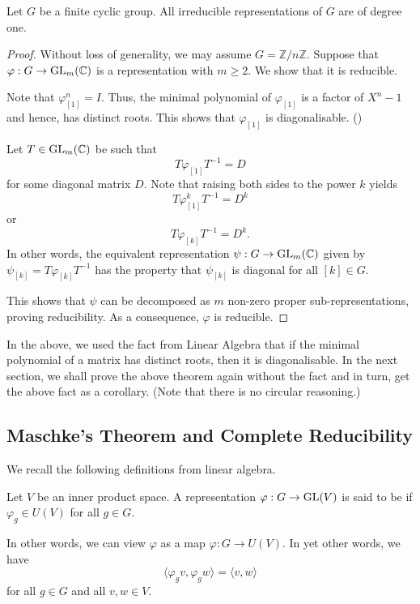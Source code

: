 \begin{thm} \label{thm:irredcyclicgroup}
	Let $G$ be a finite cyclic group. All irreducible representations of $G$ are of degree one.
\end{thm}
\begin{proof} 
	Without loss of generality, we may assume $G = \mathbb{Z}/n\mathbb{Z}.$ Suppose that $\varphi:G \to \operatorname{GL}_m(\mathbb{C})$ is a representation with $m \ge 2.$ We show that it is reducible. 

	Note that $\varphi_{[1]}^n = I.$ Thus, the minimal polynomial of $\varphi_{[1]}$ is a factor of $X^n - 1$ and hence, has distinct roots. This shows that $\varphi_{[1]}$ is diagonalisable. ()

	Let $T \in \operatorname{GL}_m(\mathbb{C})$ be such that
	\begin{equation*} 
		T\varphi_{[1]}T^{-1} = D
	\end{equation*}
	for some diagonal matrix $D.$ Note that raising both sides to the power $k$ yields
	\begin{equation*} 
		T\varphi_{[1]}^kT^{-1} = D^k
	\end{equation*}
	or
	\begin{equation*} 
		T\varphi_{[k]}T^{-1} = D^k.
	\end{equation*}
	In other words, the equivalent representation $\psi:G \to \operatorname{GL}_m(\mathbb{C})$ given by $\psi_{[k]} = T\varphi_{[k]}T^{-1}$ has the property that $\psi_{[k]}$ is diagonal for all $[k] \in G.$

	This shows that $\psi$ can be decomposed as $m$ non-zero proper sub-representations, proving reducibility. As a consequence, $\varphi$ is reducible.
\end{proof}

In the above, we used the fact from Linear Algebra that if the minimal polynomial of a matrix has distinct roots, then it is diagonalisable. In the next section, we shall prove the above theorem again without the fact and in turn, get the above fact as a corollary. (Note that there is no circular reasoning.)

\subsection{Maschke's Theorem and Complete Reducibility}
We recall the following definitions from linear algebra.

\begin{defn}%
	Let $V$ be an inner product space. A representation $\varphi:G \to \operatorname{GL}(V)$ is said to be  if $\varphi_g \in U(V)$ for all $g \in G.$
\end{defn}
In other words, we can view $\varphi$ as a map $\varphi:G \to U(V).$ In yet other words, we have
\begin{equation*} 
	\langle \varphi_gv, \varphi_gw\rangle = \langle v, w\rangle
\end{equation*}
for all $g \in G$ and all $v, w \in V.$

